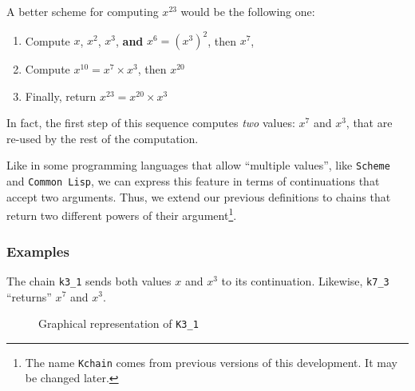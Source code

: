  A better scheme for computing $x^{23}$ would be the following one:

 \begin{enumerate}
 \item Compute $x$, $x^2$, $x^3$, \textbf{and} $x^6 = {(x^3)}^2$, then  $x^7$,
 \item Compute $x^{10} = x^7 \times x^3$, then $x^{20}$
 \item Finally, return  $x^{23} = x^{20} \times x^3$
 \end{enumerate}

In fact, the first step of this sequence  computes \emph{two}
values: $x^7$ and $x^3$, that are re-used by the rest of the computation.

  Like in some programming languages
 that allow  ``multiple values'', like \texttt{Scheme} and \texttt{Common Lisp}, we can  express this feature 
 in terms of continuations that accept two arguments.
Thus, we extend our previous definitions to chains that return two 
different powers of their argument\footnote{The name \texttt{Kchain} comes from previous versions of this development. It may be changed later.}.




\subsubsection{Examples}

The chain \texttt{k3\_1} sends both values $x$ and $x^3$ to its continuation.
Likewise, \texttt{k7\_3} ``returns''  $x^7$ and $x^3$. 




\begin{figure}[h]
  \centering
  \caption{Graphical representation of \texttt{K3\_1}}
  \label{fig:K3-1-as-dag}
\end{figure}



